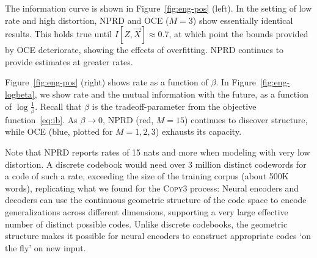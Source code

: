 \documentclass[11pt,letterpaper]{article}
\begin{document}
The information curve is shown in Figure~\ref{fig:eng-pos} (left).
In the setting of low rate and high distortion, NPRD and OCE ($M=3$) show essentially identical results.
This holds true until $I[Z, \overrightarrow{X}] \approx 0.7$, at which point the bounds provided by OCE deteriorate, showing the effects of overfitting.
NPRD continues to provide estimates at greater rates.

Figure~\ref{fig:eng-pos} (right) shows rate as a function of $\beta$.
In Figure~\ref{fig:eng-logbeta}, we show rate and the mutual information with the future, as a function of $\log \frac{1}{\beta}$.
Recall that $\beta$ is the tradeoff-parameter from the objective function~\ref{eq:ib}.
As $\beta \rightarrow 0$, NPRD (red, $M=15$) continues to discover structure, while OCE (blue, plotted for $M=1,2,3$) exhausts its capacity.

Note that NPRD reports rates of 15 nats and more when modeling with very low distortion.
A discrete codebook would need over 3 million distinct codewords for a code of such a rate, exceeding the size of the training corpus (about 500K words), replicating what we found for the \textsc{Copy3} process:
Neural encoders and decoders can use the continuous geometric structure of the code space to encode generalizations across different dimensions, supporting a very large effective number of distinct possible codes.
Unlike discrete codebooks, the geometric structure makes it possible for neural encoders to construct appropriate codes `on the fly' on new input.
\end{document}
